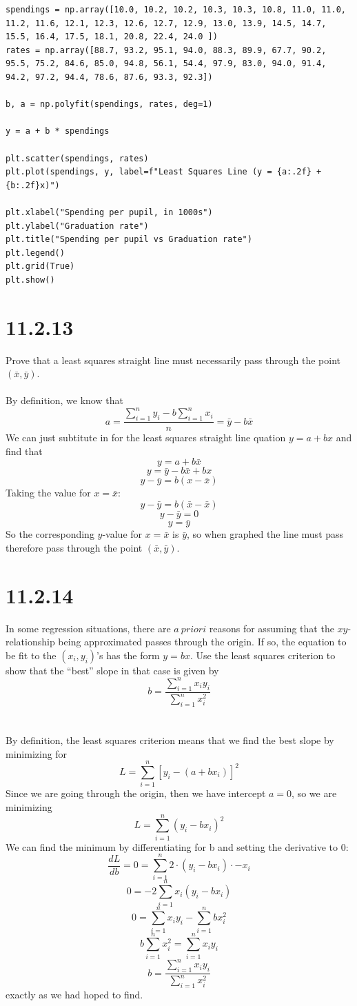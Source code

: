 \documentclass{article}
\begin{document}
{\begin{verbatim}
spendings = np.array([10.0, 10.2, 10.2, 10.3, 10.3, 10.8, 11.0, 11.0, 11.2, 11.6, 12.1, 12.3, 12.6, 12.7, 12.9, 13.0, 13.9, 14.5, 14.7, 15.5, 16.4, 17.5, 18.1, 20.8, 22.4, 24.0 ])
rates = np.array([88.7, 93.2, 95.1, 94.0, 88.3, 89.9, 67.7, 90.2, 95.5, 75.2, 84.6, 85.0, 94.8, 56.1, 54.4, 97.9, 83.0, 94.0, 91.4, 94.2, 97.2, 94.4, 78.6, 87.6, 93.3, 92.3])

b, a = np.polyfit(spendings, rates, deg=1)

y = a + b * spendings 

plt.scatter(spendings, rates)
plt.plot(spendings, y, label=f"Least Squares Line (y = {a:.2f} + {b:.2f}x)")

plt.xlabel("Spending per pupil, in 1000s")
plt.ylabel("Graduation rate")
plt.title("Spending per pupil vs Graduation rate")
plt.legend()
plt.grid(True)
plt.show()
\end{verbatim}

\section*{11.2.13}
Prove that a least squares straight line must necessarily
pass through the point \(( \bar{x}, \bar{y})\).
\\
\\
By definition, we know that 
\[
a = \frac{\sum_{i=1}^{n} y_i - b \sum_{i=1}^{n}x_i}{n} = \bar{y} - b \bar{x}
\]
We can just subtitute in for the least squares straight line quation \(y = a + bx\) and find that 
\[
y = a + b\bar{x}
\]
\[
y = \bar{y} - b\bar{x} + b x
\]
\[
y - \bar{y} = b(x - \bar{x})
\]
Taking the value for \(x = \bar{x}\):
\[
y - \bar{y} = b(\bar{x} - \bar{x})
\]
\[
y - \bar{y} = 0
\]
\[
y = \bar{y}
\]
So the corresponding \(y\)-value for \(x = \bar{x}\) is \(\bar{y}\), so when graphed the line must pass therefore pass through the point \((\bar{x}, \bar{y})\).

\section*{11.2.14}
In some regression situations, there are \(a ~ priori\) reasons for assuming that the \(xy\)-relationship being approximated passes through the origin. If so, the equation to be fit to the \((x_i, y_i)\)'s has the form \(y = bx\). Use the least squares criterion to show that the “best” slope in that case is given by 
\[
b = \frac{\sum_{i=1}^n x_i y_i}{\sum_{i=1}^{n} x_i^2}
\]
\\
\\
By definition, the least squares criterion means that we find the best slope by minimizing for 
\[
L = \sum_{i=1}^{n} [y_i - (a + bx_i)]^2
\]
Since we are going through the origin, then we have intercept \(a = 0\), so we are minimizing 
\[
L = \sum_{i=1}^{n} (y_i - bx_i)^2
\]
We can find the minimum by differentiating for b and setting the derivative to 0:
\[
\frac{dL}{db} = 0 = \sum_{i=1}^{n} 2 \cdot (y_i - bx_i) \cdot -x_i
\]
\[
0 = -2 \sum_{i=1}^{n} x_i(y_i - bx_i)
\]
\[
0 = \sum_{i=1}^{n} x_i y_i - \sum_{i=1}^{n} bx_i^2
\]
\[
b\sum_{i=1}^{n} x_i^2 = \sum_{i=1}^{n} x_i y_i
\]
\[
b = \frac{\sum_{i=1}^{n} x_i y_i }{\sum_{i=1}^{n} x_i^2}
\]
exactly as we had hoped to find.


}
\end{document}
